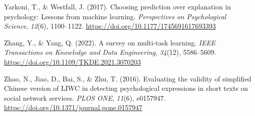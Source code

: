 \documentclass[11pt,letterpaper]{article}
\newcommand{\APAref}{\par\noindent\hangindent=0.5in\hangafter=1\relax}
\begin{document}
\APAref Yarkoni, T., \& Westfall, J. (2017). Choosing prediction over explanation in psychology: Lessons from machine learning. \emph{Perspectives on Psychological Science}, \emph{12}(6), 1100--1122. \url{https://doi.org/10.1177/1745691617693393}

\APAref Zhang, Y., \& Yang, Q. (2022). A survey on multi-task learning. \emph{IEEE Transactions on Knowledge and Data Engineering}, \emph{34}(12), 5586--5609. \url{https://doi.org/10.1109/TKDE.2021.3070203}

\APAref Zhao, N., Jiao, D., Bai, S., \& Zhu, T. (2016). Evaluating the validity of simplified Chinese version of LIWC in detecting psychological expressions in short texts on social network services. \emph{PLOS ONE}, \emph{11}(6), e0157947. \url{https://doi.org/10.1371/journal.pone.0157947}
\end{document}
